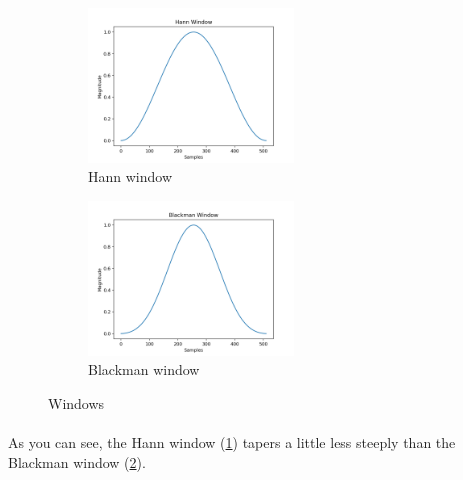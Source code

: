 \documentclass[11pt,a4paper]{article}
\begin{document}
\begin{figure}[ht]
	\centering
	\begin{subfigure}[t]{\hsize}
	\centering
		\includegraphics[width=0.6\textwidth]{hann}
		\caption{Hann window}
		\label{fig:hann}
	\end{subfigure}
	\begin{subfigure}[t]{\hsize}
		\centering
		\includegraphics[width=0.6\textwidth]{blackman}
		\caption{Blackman window}
		\label{fig:blackman}
	\end{subfigure}
	\caption{Windows}
	\label{fig:windows}
\end{figure}

\paragraph*{} As you can see, the Hann window (\ref{fig:hann}) tapers a little less steeply than the Blackman window (\ref{fig:blackman}).
\clearpage
\end{document}
